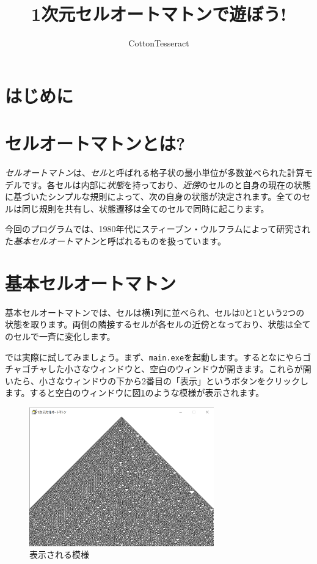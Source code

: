\documentclass{jsarticle}
\title{1次元セルオートマトンで遊ぼう!}
\author{CottonTesseract}
\begin{document}
\maketitle
\section{はじめに}

\section{セルオートマトンとは?}
\emph{セルオートマトン}は、\emph{セル}と呼ばれる格子状の最小単位が多数並べられた計算モデルです。各セルは内部に\emph{状態}を持っており、\emph{近傍}のセルのと自身の現在の状態に基づいたシンプルな規則によって、次の自身の状態が決定されます。全てのセルは同じ規則を共有し、状態遷移は全てのセルで同時に起こります。

今回のプログラムでは、1980年代にスティーブン・ウルフラムによって研究された\emph{基本セルオートマトン}と呼ばれるものを扱っています。

\section{基本セルオートマトン}
基本セルオートマトンでは、セルは横1列に並べられ、セルは0と1という2つの状態を取ります。両側の隣接するセルが各セルの近傍となっており、状態は全てのセルで一斉に変化します。

では実際に試してみましょう。まず、\texttt{main.exe}を起動します。するとなにやらゴチャゴチャした小さなウィンドウと、空白のウィンドウが開きます。これらが開いたら、小さなウィンドウの下から2番目の「表示」というボタンをクリックします。すると空白のウィンドウに図\ref{fig:rule30_1px}のような模様が表示されます。

\begin{figure}[hbtp]
    \label{fig:rule30_1px}
    \centering
    \includegraphics[width=8cm]{rule30.png}
    \caption{表示される模様}
\end{figure}
\end{document}

